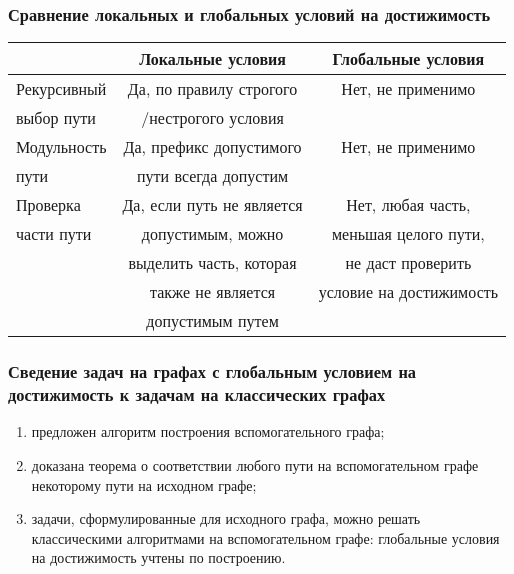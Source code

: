 \documentclass{beamer}
\begin{document}

\begin{frame}
\frametitle{Сравнение локальных и глобальных условий на достижимость}
	
	\begin{table}
		\begin{tabular}{l | c | c }
			& Локальные условия    & Глобальные условия \\
			\hline \hline
			Рекурсивный            & Да, по правилу строгого    & Нет, не применимо \\
			выбор пути			   & /нестрогого условия	    & \\
			\hline \hline
			Модульность            & Да, префикс допустимого    & Нет, не применимо \\
			пути			       & пути всегда допустим       & \\
			\hline \hline
			Проверка               & Да, если путь не является  & Нет, любая часть, \\
			части пути			   & допустимым, можно 			& меньшая целого пути, \\
								   & выделить часть, которая    & не даст проверить \\
								   & также не является      	& условие на достижимость \\
			                       & допустимым путем
		\end{tabular}
	\end{table}
	
\end{frame}


\begin{frame}
\frametitle{Сведение задач на графах с глобальным условием на достижимость к задачам на классических графах}

	\begin{enumerate}
		\item предложен алгоритм построения вспомогательного графа;
		\item доказана теорема о соответствии любого пути на вспомогательном графе некоторому пути на исходном графе;
		\item задачи, сформулированные для исходного графа, можно решать классическими алгоритмами на вспомогательном графе: глобальные условия на достижимость учтены по построению.
	\end{enumerate}

\end{frame}
\end{document}
